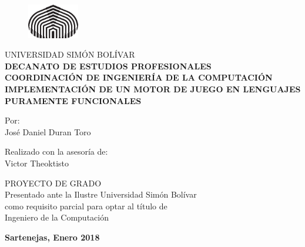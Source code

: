 \documentclass[letterpaper,12pt,times,oneside,numbered,print,index,custommargin,PageStyleI]{Classes/PhDThesisPSnPDF}
\begin{document}

\frontmatter

\graphicspath{{Figs/}}
\begin{titlepage}

\begin{figure}[!htbp!]
\centering
\includegraphics[width=0.2\textwidth]{University_Crest}
\end{figure}

\begin{center}

\Large UNIVERSIDAD SIMÓN BOLÍVAR\\
\large \textbf {DECANATO DE ESTUDIOS PROFESIONALES}\\
\large \textbf {COORDINACIÓN DE INGENIERÍA DE LA COMPUTACIÓN}\\

\vfill
\large \textbf {IMPLEMENTACIÓN DE UN MOTOR DE JUEGO EN LENGUAJES PURAMENTE FUNCIONALES}

\vfill
Por:\\
José Daniel Duran Toro

\vfill
Realizado con la asesoría de:\\
Victor Theoktisto

\vfill
\large PROYECTO DE GRADO\\
Presentado ante la Ilustre Universidad Simón Bolívar\\
como requisito parcial para optar al título de\\
Ingeniero de la Computación

\vfill
\textbf {Sartenejas, Enero 2018}

\end{center}

\end{titlepage}


%
%
%

\end{document}
